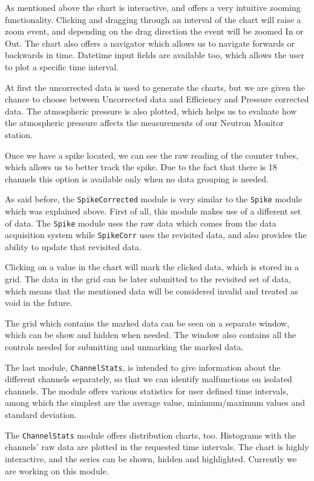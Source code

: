 \documentclass[a4paper]{jpconf}
\begin{document}
As mentioned above the chart is interactive, and offers a very intuitive
zooming functionality. Clicking and dragging through an interval of the chart will
raise a zoom event, and depending on the drag direction the event will be zoomed In
or Out. The chart also offers a navigator which allows us to navigate forwards or
backwards in time. Datetime input fields are available too, which allows the user to
plot a specific time interval.

At first the uncorrected data is used to generate the charts, but we are given
the chance to choose between Uncorrected data and Efficiency and Pressure corrected
data. The atmospheric pressure is also plotted, which helps us to evaluate how the
atmospheric pressure affects the measurements of our Neutron Monitor station.

Once we have a spike located, we can see the raw reading of the counter tubes,
which allows us to better track the spike. Due to the fact that there is 18
channels this option is available only when no data grouping is needed.

As said before, the \texttt{SpikeCorrected} module is very similar to the
\texttt{Spike} module which was explained above. First of all, this module makes
use of a different set of data. The \texttt{Spike} module uses the raw data which
comes from the data acquisition system while \texttt{SpikeCorr} uses the
revisited data, and also provides the ability to update that revisited data.

Clicking on a value in the chart will mark the clicked data, which is
stored in a grid. The data in the grid can be later submitted to the revisited
set of data, which means that the mentioned data will be considered invalid and
treated as void in the future.

The grid which contains the marked data can be seen on a separate window, which
can be show and hidden when needed. The window also contains all the
controls needed for submitting and unmarking the marked data.

The last module, \texttt{ChannelStats}, is intended to give information about the
different channels separately, so that we can identify malfunctions on isolated
channels. The module offers various statistics for user defined time intervals,
among which the simplest are the average value, minimum/maximum
values and standard deviation.

The \texttt{ChannelStats} module offers distribution charts, too. Histograms with the
channels' raw data are plotted in the requested time intervals. The chart is
highly interactive, and the series can be shown, hidden and highlighted. Currently
we are working on this module.
\end{document}
